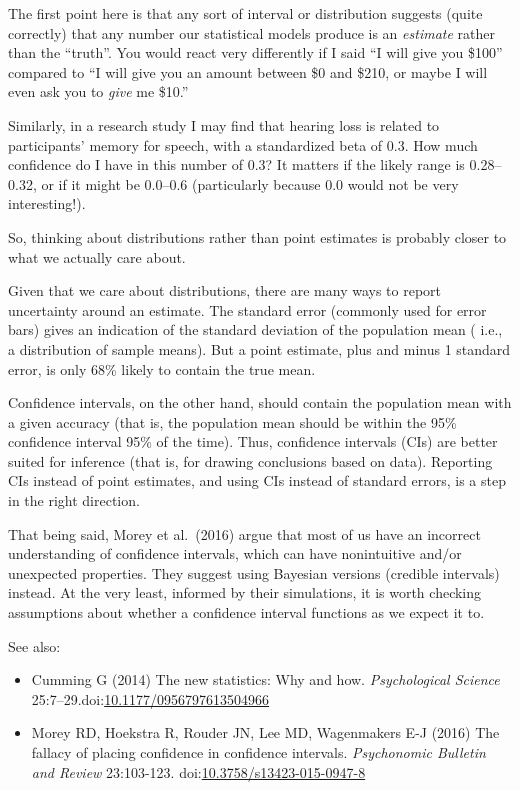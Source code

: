 \documentclass[letterpaper,oneside,11pt,article, portrait]{memoir}
\newcommand{\doi}[1]{doi:\href{http://dx.doi.org/#1}{#1}}
\newcommand{\journal}[1]{\textit{#1}} 			%
\begin{document}
The first point here is that any sort of interval or distribution suggests (quite correctly) that any number our statistical models produce is an \textit{estimate} rather than the ``truth''. You would react very differently if I said ``I will give you \$100'' compared to ``I will give you an amount between \$0 and \$210, or maybe I will even ask you to \textit{give} me \$10.''

Similarly, in a research study I may find that hearing loss is related to participants' memory for speech, with a standardized beta of 0.3. How much confidence do I have in this number of 0.3? It matters if the likely range is 0.28--0.32, or if it might be 0.0--0.6 (particularly because 0.0 would not be very interesting!).

So, thinking about distributions rather than point estimates is probably closer to what we actually care about.

Given that we care about distributions, there are many ways to report uncertainty around an estimate. The standard error (commonly used for error bars) gives an indication of the standard deviation of the population mean ( i.e., a distribution of sample means). But a point estimate, plus and minus 1 standard error, is only 68\% likely to contain the true mean.

Confidence intervals, on the other hand, should contain the population mean with a given accuracy (that is, the population mean should be within the 95\% confidence interval 95\% of the time). Thus, confidence intervals (CIs) are better suited for inference (that is, for drawing conclusions based on data). Reporting CIs instead of point estimates, and using CIs instead of standard errors, is a step in the right direction.

That being said, Morey et al.\ (2016) argue that most of us have an incorrect understanding of confidence intervals, which can have nonintuitive and/or unexpected properties. They suggest using Bayesian versions (credible intervals) instead. At the very least, informed by their simulations, it is worth checking assumptions about whether a confidence interval functions as we expect it to.

\vspace{1em} \noindent See also:

\begin{itemize}
\item Cumming G (2014) The new statistics: Why and how. \journal{Psychological Science} 25:7--29.\newline \doi{10.1177/0956797613504966}

\item Morey RD, Hoekstra R, Rouder JN, Lee MD, Wagenmakers E-J (2016) The fallacy of placing confidence in confidence intervals. \journal{Psychonomic Bulletin and Review} 23:103-123. \doi{10.3758/s13423-015-0947-8}


\end{itemize}
\end{document}
